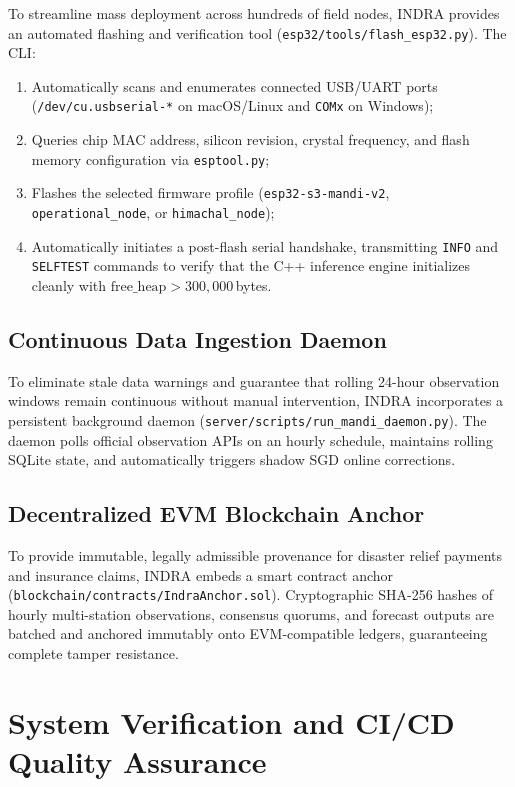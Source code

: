 \documentclass[journal,a4paper]{IEEEtran}
\begin{document}
To streamline mass deployment across hundreds of field nodes, INDRA provides an automated flashing and verification tool (\nolinkurl{esp32/tools/flash_esp32.py}). The CLI:
\begin{enumerate}
  \item Automatically scans and enumerates connected USB/UART ports (\texttt{/dev/cu.usbserial-*} on macOS/Linux and \texttt{COMx} on Windows);
  \item Queries chip MAC address, silicon revision, crystal frequency, and flash memory configuration via \texttt{esptool.py};
  \item Flashes the selected firmware profile (\nolinkurl{esp32-s3-mandi-v2}, \nolinkurl{operational_node}, or \nolinkurl{himachal_node});
  \item Automatically initiates a post-flash serial handshake, transmitting \texttt{INFO} and \texttt{SELFTEST} commands to verify that the C++ inference engine initializes cleanly with $\text{free\_heap} > 300{,}000$\,bytes.
\end{enumerate}

\subsection{Continuous Data Ingestion Daemon}

To eliminate stale data warnings and guarantee that rolling 24-hour observation windows remain continuous without manual intervention, INDRA incorporates a persistent background daemon (\nolinkurl{server/scripts/run_mandi_daemon.py}). The daemon polls official observation APIs on an hourly schedule, maintains rolling SQLite state, and automatically triggers shadow SGD online corrections.

\subsection{Decentralized EVM Blockchain Anchor}

To provide immutable, legally admissible provenance for disaster relief payments and insurance claims, INDRA embeds a smart contract anchor (\nolinkurl{blockchain/contracts/IndraAnchor.sol}). Cryptographic SHA-256 hashes of hourly multi-station observations, consensus quorums, and forecast outputs are batched and anchored immutably onto EVM-compatible ledgers, guaranteeing complete tamper resistance.

\section{System Verification and CI/CD Quality Assurance}
\end{document}
